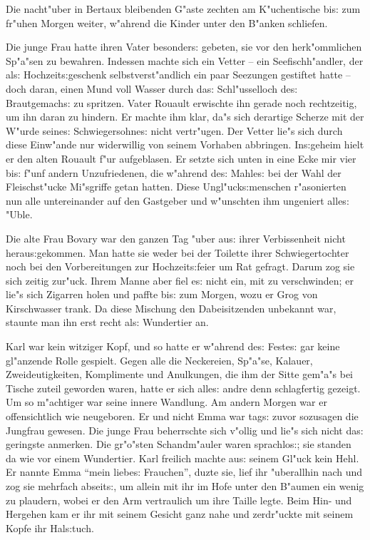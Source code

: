 \documentclass[oneside,12pt]{book}
\newcommand{\s}{s:}%
\begin{document}
Die nacht"uber in Bertaux bleibenden G"aste zechten am K"uchentische
bi{\s} zum fr"uhen Morgen weiter, w"ahrend die Kinder unter den
B"anken schliefen.

Die junge Frau hatte ihren Vater besonder{\s} gebeten, sie vor den
herk"ommlichen Sp"a"sen zu bewahren. Indessen machte sich ein
Vetter -- ein See\-fisch\-h"and\-ler, der al{\s}
Hoch\-zeit{\s}\-ge\-schenk selbstverst"andlich ein paar Seezungen
gestiftet hatte -- doch daran, einen Mund voll Wasser durch da{\s}
Schl"usselloch de{\s} Brautgemach{\s} zu spritzen. Vater Rouault
erwischte ihn gerade noch rechtzeitig, um ihn daran zu hindern. Er
machte ihm klar, da"s sich derartige Scherze mit der W"urde
seine{\s} Schwiegersohne{\s} nicht vertr"ugen. Der Vetter lie"s
sich durch diese Einw"ande nur widerwillig von seinem Vorhaben
abbringen. In{\s}geheim hielt er den alten Rouault f"ur
aufgeblasen. Er setzte sich unten in eine Ecke mir vier bi{\s}
f"unf andern Unzufriedenen, die w"ahrend de{\s} Mahle{\s} bei der
Wahl der Fleischst"ucke Mi"sgriffe getan hatten. Diese
Ungl"uck{\s}menschen r"asonierten nun alle untereinander auf den
Gastgeber und w"unschten ihm ungeniert alle{\s} "Uble.

Die alte Frau Bovary war den ganzen Tag "uber au{\s} ihrer
Verbissenheit nicht herau{\s}gekommen. Man hatte sie weder bei der
Toilette ihrer Schwiegertochter noch bei den Vorbereitungen zur
Hochzeit{\s}feier um Rat gefragt. Darum zog sie sich zeitig
zur"uck. Ihrem Manne aber fiel e{\s} nicht ein, mit zu verschwinden;
er lie"s sich Zigarren holen und paffte bi{\s} zum Morgen, wozu er
Grog von Kirschwasser trank. Da diese Mischung den Dabeisitzenden
unbekannt war, staunte man ihn erst recht al{\s} Wundertier an.

Karl war kein witziger Kopf, und so hatte er w"ahrend de{\s}
Feste{\s} gar keine gl"anzende Rolle gespielt. Gegen alle die
Neckereien, Sp"a"se, Kalauer, Zweideutigkeiten, Komplimente und
Anulkungen, die ihm der Sitte gem"a"s bei Tische zuteil geworden
waren, hatte er sich alle{\s} andre denn schlagfertig gezeigt. Um
so m"achtiger war seine innere Wandlung. Am andern Morgen war er
offensichtlich wie neugeboren. Er und nicht Emma war tag{\s} zuvor
sozusagen die Jungfrau gewesen. Die junge Frau beherrschte sich
v"ollig und lie"s sich nicht da{\s} geringste anmerken. Die
gr"o"sten Schandm"auler waren sprachlo{\s}; sie standen da wie vor
einem Wundertier. Karl freilich machte au{\s} seinem Gl"uck kein
Hehl. Er nannte Emma "`mein liebe{\s} Frauchen"', duzte sie, lief
ihr "uberallhin nach und zog sie mehrfach abseit{\s}, um allein
mit ihr im Hofe unter den B"aumen ein wenig zu plaudern, wobei er
den Arm vertraulich um ihre Taille legte. Beim Hin- und Hergehen
kam er ihr mit seinem Gesicht ganz nahe und zerdr"uckte mit seinem
Kopfe ihr Hal{\s}tuch.
\end{document}
